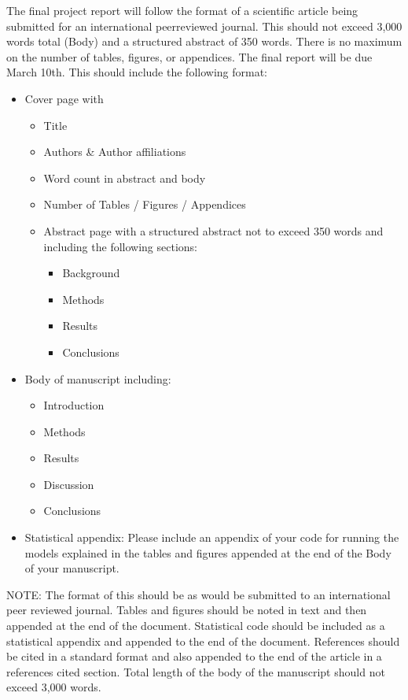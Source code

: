 \documentclass[fancyhdr,10pt]{article}
\begin{document}
The final project report will follow the format of a scientific article being submitted for an international peerreviewed journal. This should not exceed 3,000 words total (Body) and a structured abstract of 350 words. There is no maximum on the number of tables, figures, or appendices. The final report will be due March 10th. This should include the following format:

\begin{itemize}
 \item Cover page with
 \begin{itemize}
  \item Title
  \item Authors \& Author affiliations
  \item Word count in abstract and body
  \item Number of Tables / Figures / Appendices
  \item Abstract page with a structured abstract not to exceed 350 words and including the following sections:
  \begin{itemize}
   \item Background
   \item Methods
   \item Results
   \item Conclusions
  \end{itemize}
 \end{itemize}
 \item Body of manuscript including:
 \begin{itemize}
  \item Introduction
  \item Methods
  \item Results
  \item Discussion
  \item Conclusions
 \end{itemize}
 \item Statistical appendix: Please include an appendix of your code for running the models explained in the tables and figures appended at the end of the Body of your manuscript.
\end{itemize}
 NOTE: The format of this should be as would be submitted to an international peer reviewed journal. Tables and figures should be noted in text and then appended at the end of the document. Statistical code should be included as a statistical appendix and appended to the end of the document. References should be cited in a standard format and also appended to the end of the article in a references cited section. Total length of the body of the manuscript should not exceed 3,000 words.
\end{document}
